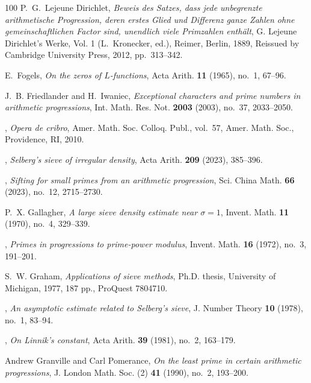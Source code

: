 \documentclass[11pt]{amsart}
\numberwithin{equation}{section}
\theoremstyle{plain}
\theoremstyle{definition}
\theoremstyle{remark}
\newcommand{\1}{\mathbf{1}}
\begin{document}
\begin{thebibliography}{100}
P.~G.~Lejeune Dirichlet, \emph{Beweis des {S}atzes, dass jede unbegrenzte
  arithmetische {P}rogression, deren erstes {G}lied und {D}ifferenz ganze
  {Z}ahlen ohne gemeinschaftlichen {F}actor sind, unendlich viele {P}rimzahlen
  enth{\"a}lt}, G. Lejeune Dirichlet's Werke, Vol. 1 (L.~Kronecker, ed.),
  Reimer, Berlin, 1889, Reissued by Cambridge University Press, 2012,
  pp.~313--342.

E.~Fogels, \emph{On the zeros of {$L$}-functions}, Acta Arith. \textbf{11}
  (1965), no.~1, 67--96.

J.~B. Friedlander and H.~Iwaniec, \emph{Exceptional characters and prime
  numbers in arithmetic progressions}, Int. Math. Res. Not. \textbf{2003}
  (2003), no.~37, 2033--2050.

\bysame, \emph{Opera de cribro}, Amer. Math. Soc. Colloq. Publ., vol.~57, Amer.
  Math. Soc., Providence, RI, 2010.

\bysame, \emph{Selberg's sieve of irregular density}, Acta Arith. \textbf{209}
  (2023), 385--396.

\bysame, \emph{Sifting for small primes from an arithmetic progression}, Sci.
  China Math. \textbf{66} (2023), no.~12, 2715--2730.

P.~X. Gallagher, \emph{A large sieve density estimate near {$\sigma=1$}},
  Invent. Math. \textbf{11} (1970), no.~4, 329--339.

\bysame, \emph{Primes in progressions to prime-power modulus}, Invent. Math.
  \textbf{16} (1972), no.~3, 191--201.

S.~W. Graham, \emph{Applications of sieve methods}, Ph.D. thesis, University of
  Michigan, 1977, 187 pp., ProQuest 7804710. 

\bysame, \emph{An asymptotic estimate related to {S}elberg's sieve}, J. Number
  Theory \textbf{10} (1978), no.~1, 83--94.

\bysame, \emph{On {L}innik's constant}, Acta Arith. \textbf{39} (1981), no.~2,
  163--179.

Andrew Granville and Carl Pomerance, \emph{On the least prime in certain
  arithmetic progressions}, J. London Math. Soc. (2) \textbf{41} (1990), no.~2,
  193--200.


\end{thebibliography}
\end{document}

